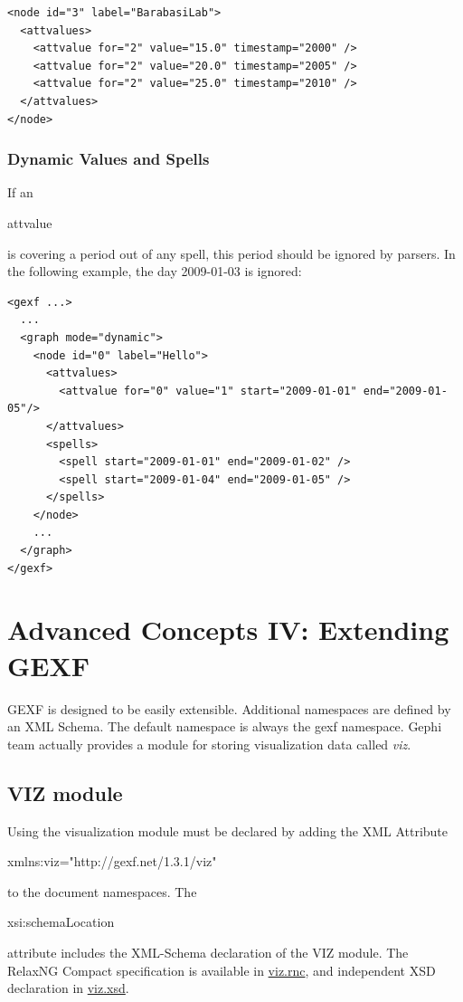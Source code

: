 \documentclass[a4paper,10pt]{article}
\begin{document}
\lstset{ style=gexf }
\begin{lstlisting}[caption={Using timestamp representation}]
<node id="3" label="BarabasiLab">
  <attvalues>
    <attvalue for="2" value="15.0" timestamp="2000" />
    <attvalue for="2" value="20.0" timestamp="2005" />
    <attvalue for="2" value="25.0" timestamp="2010" />
  </attvalues>
</node>
\end{lstlisting}

\subsubsection{Dynamic Values and Spells}

If an \begin{footnotesize}attvalue\end{footnotesize} is covering a period out of any spell, this period should be ignored by parsers. In the following example, the day 2009-01-03 is ignored:

\lstset{ style=gexf }
\begin{lstlisting}[caption={Spells and attvalues}]
<gexf ...>
  ...
  <graph mode="dynamic">
    <node id="0" label="Hello">
      <attvalues>
        <attvalue for="0" value="1" start="2009-01-01" end="2009-01-05"/>
      </attvalues>
      <spells>
        <spell start="2009-01-01" end="2009-01-02" />
        <spell start="2009-01-04" end="2009-01-05" />
      </spells>
    </node>
    ...
  </graph>
</gexf>
\end{lstlisting}

\section{Advanced Concepts IV: Extending GEXF} \label{extendgexf}

GEXF is designed to be easily extensible. Additional namespaces are defined by an XML Schema. The default namespace is always the gexf namespace. Gephi team actually provides a module for storing visualization data called \textit{viz}.

\subsection{VIZ module} \label{viz}

Using the visualization module must be declared by adding the XML Attribute \begin{footnotesize}xmlns:viz="http://gexf.net/1.3.1/viz"\end{footnotesize} to the document namespaces. The \begin{footnotesize}xsi:schemaLocation\end{footnotesize} attribute includes the XML-Schema declaration of the VIZ module. The RelaxNG Compact specification is available in \href{http://gexf.net/1.3.1/viz.rnc}{viz.rnc}, and independent XSD declaration in \href{http://gexf.net/1.3.1/viz.xsd}{viz.xsd}.
\end{document}
